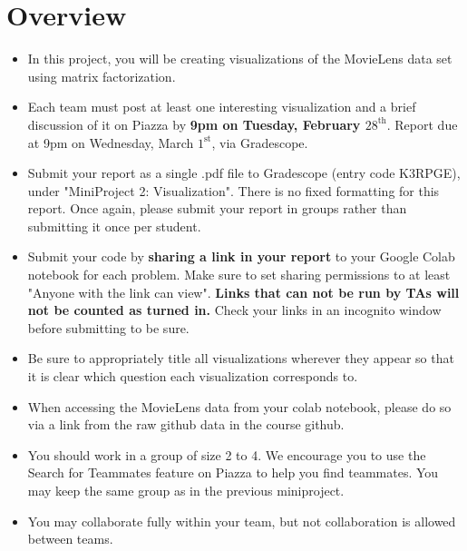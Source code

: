 \newif\ifshowsolutions
\showsolutionstrue





\pagestyle{fancy}

\section{Overview}
\begin{itemize}
	\item In this project, you will be creating visualizations of the MovieLens data set using matrix factorization.
	\item Each team must post at least one interesting visualization and a brief discussion of it on Piazza by \textbf{9pm on Tuesday, February $28^{\text{th}}$}. Report due at 9pm on Wednesday, March $1^{\text{st}}$, via Gradescope.   
	\item Submit your report as a single .pdf file to Gradescope (entry code K3RPGE), under "MiniProject 2: Visualization". There is no fixed formatting for this report. Once again, please submit your report in groups rather than submitting it once per student.
	 \item Submit your code by \textbf{sharing a link in your report} to your Google Colab notebook for each problem. Make sure to set sharing permissions to at least "Anyone with the link can view". \textbf{Links that can not be run by TAs will not be counted as turned in.} Check your links in an incognito window before submitting to be sure.
    \item Be sure to appropriately title all visualizations wherever they appear so that it is clear which question each visualization corresponds to.
    \item When accessing the MovieLens data from your colab notebook, please do so via a link from the raw github data in the course github.
	\item You should work in a group of size 2 to 4. We encourage you to use the Search for Teammates feature on Piazza to help you find teammates. You may keep the same group as in the previous miniproject.
	\item You may collaborate fully within your team, but not collaboration is allowed between teams.
\end{itemize}

